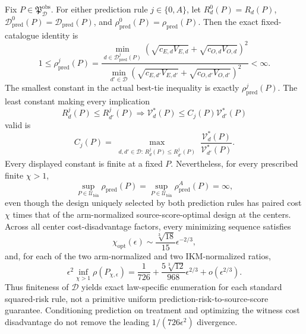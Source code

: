 Fix \(P\in\mathfrak P_{\mathcal D}^{\mathrm{obs}}\).  For either prediction rule \(j\in\{0,A\}\), let \(R_d^0(P)=R_d(P)\), \(\mathcal D_{\mathrm{pred}}^0(P)=\mathcal D_{\mathrm{pred}}(P)\), and \(\rho_{\mathrm{pred}}^0(P)=\rho_{\mathrm{pred}}(P)\).  Then the exact fixed-catalogue identity is
\[
 1\le\rho_{\mathrm{pred}}^j(P)
 =\frac{\min_{d\in\mathcal D_{\mathrm{pred}}^j(P)}
 (\sqrt{c_{E,d}V_{E,d}}+\sqrt{c_{O,d}V_{O,d}})^2}
 {\min_{d'\in\mathcal D}
 (\sqrt{c_{E,d'}V_{E,d'}}+\sqrt{c_{O,d'}V_{O,d'}})^2}<\infty.                 \tag{1}
\]
The smallest constant in the actual best-tie inequality is exactly \(\rho_{\mathrm{pred}}^j(P)\).  The least constant making every implication
\[
 R_d^j(P)\le R_{d'}^j(P)
 \Longrightarrow
 \mathcal V_d^*(P)\le C_j(P)\mathcal V_{d'}^*(P)
\]
valid is
\[
 C_j(P)=
 \max_{\substack{d,d'\in\mathcal D:\,R_d^j(P)\le R_{d'}^j(P)}}
 \frac{\mathcal V_d^*(P)}{\mathcal V_{d'}^*(P)}.                             \tag{2}
\]
Every displayed constant is finite at a fixed \(P\).  Nevertheless, for every prescribed finite \(\chi>1\),
\[
 \sup_{P\in\mathcal U_{\mathrm{bin}}}\rho_{\mathrm{pred}}(P)
 =\sup_{P\in\mathcal U_{\mathrm{bin}}}\rho_{\mathrm{pred}}^A(P)=\infty,     \tag{3}
\]
even though the design uniquely selected by both prediction rules has paired cost \(\chi\) times that of the arm-normalized source-score-optimal design at the centers.  Across all center cost-disadvantage factors, every minimizing sequence satisfies
\[
 \chi_{\mathrm{opt}}(\epsilon)
 \sim\frac{\sqrt[3]{18}}{15}\epsilon^{-2/3},
\]
and, for each of the two arm-normalized and two IKM-normalized ratios,
\[
 \epsilon^2\inf_{\chi>1}\rho(P_{\chi,\epsilon})
 =\frac1{726}+\frac{5\sqrt[3]{12}}{968}\epsilon^{2/3}+o(\epsilon^{2/3}).      \tag{4}
\]
Thus finiteness of \(\mathcal D\) yields exact law-specific enumeration for each standard squared-risk rule, not a primitive uniform prediction-risk-to-source-score guarantee.  Conditioning prediction on treatment and optimizing the witness cost disadvantage do not remove the leading \(1/(726\epsilon^2)\) divergence.